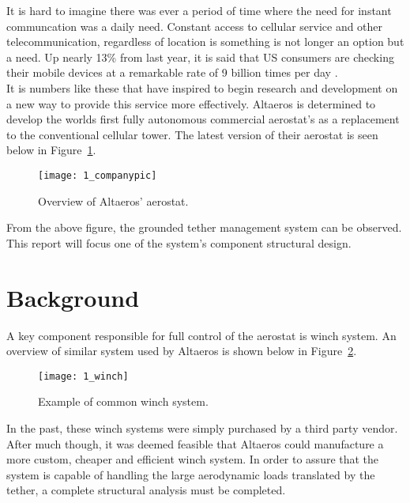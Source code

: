 \label{chapt:intro}

It is hard to imagine there was ever a period of time where the need for instant communcation was a daily need. Constant access to cellular service and other telecommunication, regardless of location is something is not longer an option but a need. Up nearly 13\% from last year, it is said that US consumers are checking their mobile devices at a remarkable rate of 9 billion times per day \cite{deloittestat}.\\

It is numbers like these that have inspired \Company to begin research and development on a new way to provide this service more effectively. Altaeros is determined to develop the worlds first fully autonomous commercial aerostat's as a replacement to the conventional cellular tower. The latest version of their aerostat is seen below in Figure~\ref{fig:1_companypic}.

\begin{figure}[H]
	\centering
	\texttt{[image: 1\_companypic]}
	\caption[Overview of Altaeros' aerostat.]{Overview of Altaeros' aerostat.\protect\cite{companypicweb}}
	\label{fig:1_companypic}
\end{figure}

From the above figure, the grounded tether management system can be observed. This report will focus one of the system's component structural design.

\section{Background} 

A key component responsible for full control of the aerostat is winch system. An overview of similar system used by Altaeros is shown below in Figure~\ref{fig:1_winch}.
\begin{figure}[H]
	\centering
	\texttt{[image: 1\_winch]}
	\caption[Example of common winch system.]{Example of common winch system.\protect\cite{winchpic}}
	\label{fig:1_winch}
\end{figure}

In the past, these winch systems were simply purchased by a third party vendor. After much though, it was deemed feasible that Altaeros could manufacture a more custom, cheaper and efficient winch system. In order to assure that the system is capable of handling the large aerodynamic loads translated by the tether, a complete structural analysis must be completed.

